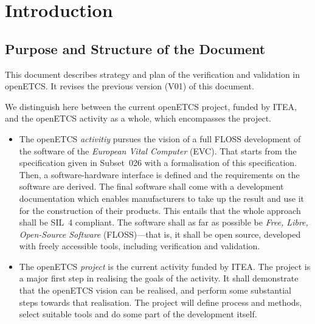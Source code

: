 \documentclass{../template/openetcs_report}
\begin{document}



\mainmatter


\chapter{Introduction}

\section{Purpose and Structure of the Document}
\label{sec:purpose}

This document describes strategy and plan of the verification and
validation in openETCS. It revises the previous version (V01) of this
document.


We distinguish here between the current openETCS project, funded by
ITEA, and the openETCS activity as a whole, which encompasses the
project.

\begin{itemize}
\item The openETCS \emph{activitiy} pursues the vision of a full FLOSS
  development of the software of the \emph{European Vital Computer}
  (EVC). That starts from the specification given in Subset~026 with a
  formalisation of this specification. Then, a software-hardware
  interface is defined and the requirements on the software are
  derived. The final software shall come with a development
  documentation which enables manufacturers to take up the result and
  use it for the construction of their products. This entails that the
  whole approach shall be SIL~4 compliant. The software shall as
  far as possible be \emph{Free, Libre, Open-Source Software}
  (FLOSS)---that is, it shall be open source, developed with freely
  accessible tools, including verification and validation.
\item The openETCS \emph{project} is the current activity funded by
  ITEA.  The project is a major first step in realising the goals of
  the activity. It shall demonstrate that the openETCS vision can be
  realised, and perform some substantial steps towards that
  realisation. The project will define process and methods, select
  suitable tools and do some part of the development itself.
\end{itemize}
\end{document}
